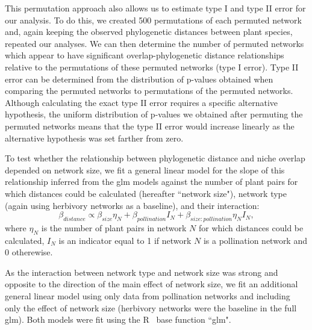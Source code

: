 \documentclass[12pt]{article}
\begin{document}
\begin{spacing}{1.5}
    This permutation approach also allows us to estimate type I and type II 
    error for our analysis. To do this, we created 500 permutations of each 
    permuted network and, again keeping the observed phylogenetic distances 
    between plant species, repeated our analyses. We can then determine the 
    number of permuted networks which appear to have significant 
    overlap-phylogenetic distance relationships relative to the permutations 
    of these permuted networks (type I error). Type II error can be determined
    from the distribution of p-values obtained when comparing the permuted 
    networks to permutations of the permuted networks. Although calculating 
    the exact type II error requires a specific alternative hypothesis, the 
    uniform distribution of p-values we obtained after permuting the permuted 
    networks means that the type II error would increase linearly as the 
    alternative hypothesis was set farther from zero.


    To test whether the relationship between phylogenetic distance and niche overlap depended on network size, we fit a general linear model for the slope of this relationship inferred from the glm models against the number of plant pairs for which distances could be calculated (hereafter ``network size"), network type (again using herbivory networks as a baseline), and their interaction:
      \begin{equation}
        \beta_{distance} \propto \beta_{size} \eta_{N} + \beta_{pollination} I_N + \beta_{size:pollination} \eta_{N} I_N ,
      \end{equation}
    where $\eta_{N}$ is the number of plant pairs in network $N$ for which distances could be calculated, $I_N$ is an indicator equal to 1 if network $N$ is a pollination network and 0 otherewise. 


    As the interaction between network type and network size was strong and opposite to the direction of the main effect of network size, we fit an additional general linear model using only data from pollination networks and including only the effect of network size (herbivory networks were the baseline in the full glm). Both models were fit using the R~\citep{R} base function ``glm".



\end{spacing}
\end{document}
